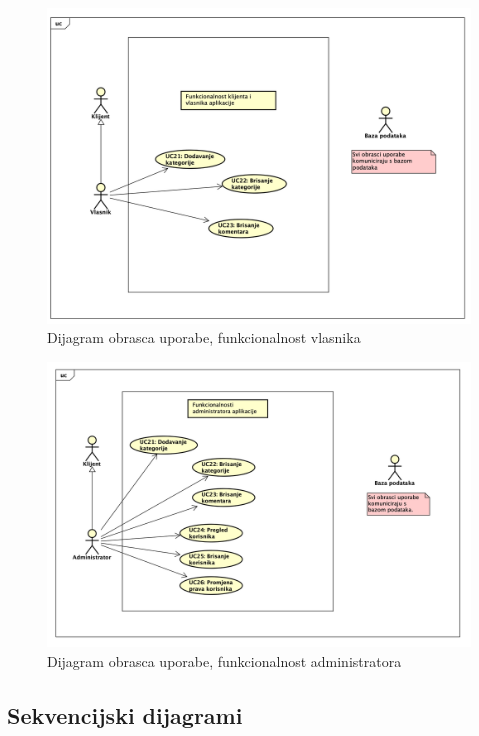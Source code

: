 				\begin{figure}[H]
					\includegraphics[scale=0.6]{dijagrami/Vlasnik.png} 
					\centering
					\caption{Dijagram obrasca uporabe, funkcionalnost vlasnika}
					\label{fig:vlasnik}
				\end{figure}		
				\eject 

				\begin{figure}[H]
					\includegraphics[scale=0.6]{dijagrami/Administrator.png} 
					\centering
					\caption{Dijagram obrasca uporabe, funkcionalnost administratora}
					\label{fig:administrator}
				\end{figure}		
				\eject 
			\subsection{Sekvencijski dijagrami}
				
